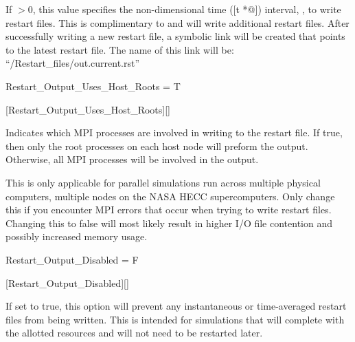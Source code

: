 \begin{nmldescbody}
If $>0$, this value specifies the non-dimensional time
([t *@\tstar]) interval, ,
to write restart files.
%
This is complimentary to 
and will write additional restart files.
%
After successfully writing a new restart file, a
symbolic link will be created that points to the latest restart
file.
%
The name of this link will be:
\newline\indent
``\slash{Restart\_files}\slash{out.current.rst}'' 
\end{nmldescbody}


\begin{nmldescitem}
Restart_Output_Uses_Host_Roots = T
\end{nmldescitem}
[Restart\_Output\_Uses\_Host\_Roots][]

\begin{nmldescbody}
Indicates which MPI processes are involved in writing to the
restart file.
%
If true, then only the root processes on each host node will
preform the output.
%
Otherwise, all MPI processes will be involved in the output.

\NOTE
This is only applicable for parallel simulations run across
multiple physical computers, \forexample multiple nodes on
the NASA HECC supercomputers.
%
Only change this if you encounter MPI errors that occur when
trying to write restart files.
%
Changing this to false will most likely result in higher
I\slash O file contention and possibly increased memory usage.
\end{nmldescbody}


\begin{nmldescitem}
Restart_Output_Disabled = F
\end{nmldescitem}
[Restart\_Output\_Disabled][]

\begin{nmldescbody}
If set to true, this option will prevent any instantaneous or time-averaged
restart files from being written.
%
This is intended for simulations that will complete with the allotted
resources and will not need to be restarted later.
\end{nmldescbody}

